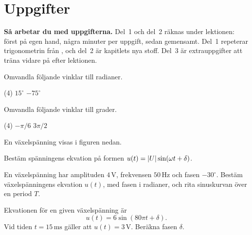 
\section{Uppgifter}
\label{c10:sec:uppgifter}

\begin{aside}
\textbf{Så arbetar du med uppgifterna.} Del~1 och del~2 räknas under lektionen: först på egen
hand, några minuter per uppgift, sedan gemensamt. Del~1 repeterar trigonometrin från ,
och del~2 är kapitlets nya stoff. Del~3 är extrauppgifter att träna vidare på efter lektionen.

\end{aside}


Omvandla följande vinklar till radianer.
\begin{delar}(4)
  \task $15^{\circ}$
  \task $-75^{\circ}$
\end{delar}

Omvandla följande vinklar till grader.
\begin{delar}(4)
  \task $-\pi/6$
  \task $3\pi/2$
\end{delar}

En växelspänning visas i figuren nedan.


Bestäm spänningens ekvation på formen $u(t) = \lvert U\rvert\sin(\omega t + \delta)$.

En växelspänning har amplituden $4\,\text{V}$, frekvensen $50\,\text{Hz}$ och fasen $-30^{\circ}$.
Bestäm växelspänningens ekvation $u(t)$, med fasen i radianer, och rita sinuskurvan över en
period $T$.

Ekvationen för en given växelspänning är
\[
  u(t) = 6\sin(80\pi t + \delta).
\]
Vid tiden $t = 15\,\text{ms}$ gäller att $u(t) = 3\,\text{V}$. Beräkna fasen $\delta$.


